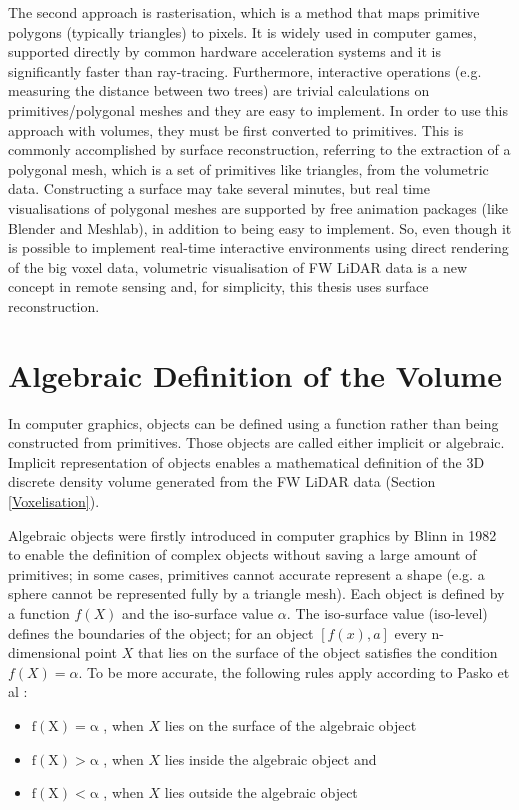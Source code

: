 \documentclass{subfiles}
\begin{document}
\par The second approach is rasterisation, which is a method that maps primitive polygons (typically triangles) to pixels.  It is widely used in computer games, supported directly by common hardware acceleration systems and it is significantly faster than ray-tracing. Furthermore, interactive operations (e.g. measuring the distance between two trees) are trivial calculations on primitives/polygonal meshes and they are easy to implement.  In order to use this approach with volumes, they must be first converted to primitives.  This is commonly accomplished by surface reconstruction, referring to the extraction of a polygonal mesh, which is a set of primitives like triangles, from the volumetric data. Constructing a surface may take several minutes, but real time visualisations of polygonal meshes are supported by free animation packages (like Blender and Meshlab), in addition to being easy to implement.  So, even though it is possible to implement real-time interactive environments using direct rendering of the big voxel data, volumetric visualisation of FW LiDAR data is a new concept in remote sensing and, for simplicity, this thesis uses surface reconstruction.



\section{Algebraic Definition of the Volume}\label{sec:AlgebracObjects}

In computer graphics, objects can be defined using a function rather than being constructed from primitives. Those objects are called either implicit or algebraic. Implicit representation of objects enables a mathematical definition of the 3D discrete density volume generated from the FW LiDAR data (Section \ref{Voxelisation}). 

\par Algebraic objects were firstly introduced in computer graphics by Blinn in 1982 \cite{Blinn1982} to enable the definition of complex objects without saving a large amount of primitives; in some cases, primitives cannot accurate represent a shape (e.g. a sphere cannot be represented fully by a triangle mesh). Each object is defined by a function $ \mathit{f(X)} $ and the iso-surface value $\alpha$. The iso-surface value (iso-level) defines the boundaries of the object; for an object $ [f(x),a]$ every n-dimensional point $ \mathit{X} $  that lies on the surface of the object satisfies the condition $ \mathit{f(X)=\alpha }  $. To be more accurate, the following rules apply according to Pasko et al \cite{Pasko1994}: 
\begin{itemize}
	\item $	\mathrm{f(X) = \alpha }$ , when $X$ lies on the surface of the algebraic object
	\item $	\mathrm{f(X) > \alpha }$ , when $X$ lies inside the algebraic object and
	\item $	\mathrm{f(X) < \alpha }$ , when $X$ lies outside the algebraic object	 
\end{itemize}
\end{document}
